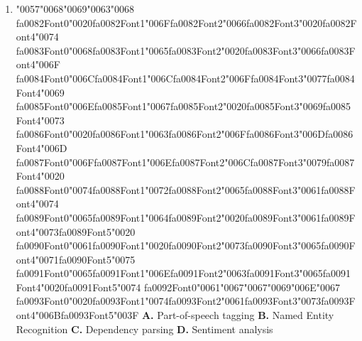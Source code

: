 \documentclass[11pt]{article}
\begin{document}
\begin{enumerate}[leftmargin=*]
  \item {\char"0057}{\char"0068}{\char"0069}{\char"0063}{\char"0068} {\csname fa0082Font0\endcsname\char"0020}{\csname fa0082Font1\endcsname\char"006F}{\csname fa0082Font2\endcsname\char"0066}{\csname fa0082Font3\endcsname\char"0020}{\csname fa0082Font4\endcsname\char"0074} {\csname fa0083Font0\endcsname\char"0068}{\csname fa0083Font1\endcsname\char"0065}{\csname fa0083Font2\endcsname\char"0020}{\csname fa0083Font3\endcsname\char"0066}{\csname fa0083Font4\endcsname\char"006F} {\csname fa0084Font0\endcsname\char"006C}{\csname fa0084Font1\endcsname\char"006C}{\csname fa0084Font2\endcsname\char"006F}{\csname fa0084Font3\endcsname\char"0077}{\csname fa0084Font4\endcsname\char"0069} {\csname fa0085Font0\endcsname\char"006E}{\csname fa0085Font1\endcsname\char"0067}{\csname fa0085Font2\endcsname\char"0020}{\csname fa0085Font3\endcsname\char"0069}{\csname fa0085Font4\endcsname\char"0073} {\csname fa0086Font0\endcsname\char"0020}{\csname fa0086Font1\endcsname\char"0063}{\csname fa0086Font2\endcsname\char"006F}{\csname fa0086Font3\endcsname\char"006D}{\csname fa0086Font4\endcsname\char"006D} {\csname fa0087Font0\endcsname\char"006F}{\csname fa0087Font1\endcsname\char"006E}{\csname fa0087Font2\endcsname\char"006C}{\csname fa0087Font3\endcsname\char"0079}{\csname fa0087Font4\endcsname\char"0020} {\csname fa0088Font0\endcsname\char"0074}{\csname fa0088Font1\endcsname\char"0072}{\csname fa0088Font2\endcsname\char"0065}{\csname fa0088Font3\endcsname\char"0061}{\csname fa0088Font4\endcsname\char"0074} {\csname fa0089Font0\endcsname\char"0065}{\csname fa0089Font1\endcsname\char"0064}{\csname fa0089Font2\endcsname\char"0020}{\csname fa0089Font3\endcsname\char"0061}{\csname fa0089Font4\endcsname\char"0073}{\csname fa0089Font5\endcsname\char"0020} {\csname fa0090Font0\endcsname\char"0061}{\csname fa0090Font1\endcsname\char"0020}{\csname fa0090Font2\endcsname\char"0073}{\csname fa0090Font3\endcsname\char"0065}{\csname fa0090Font4\endcsname\char"0071}{\csname fa0090Font5\endcsname\char"0075} {\csname fa0091Font0\endcsname\char"0065}{\csname fa0091Font1\endcsname\char"006E}{\csname fa0091Font2\endcsname\char"0063}{\csname fa0091Font3\endcsname\char"0065}{\csname fa0091Font4\endcsname\char"0020}{\csname fa0091Font5\endcsname\char"0074} {\csname fa0092Font0\endcsname\char"0061}{\char"0067}{\char"0067}{\char"0069}{\char"006E}{\char"0067} {\csname fa0093Font0\endcsname\char"0020}{\csname fa0093Font1\endcsname\char"0074}{\csname fa0093Font2\endcsname\char"0061}{\csname fa0093Font3\endcsname\char"0073}{\csname fa0093Font4\endcsname\char"006B}{\csname fa0093Font5\endcsname\char"003F}
    \textbf{A.} Part-of-speech tagging
    \textbf{B.} Named Entity Recognition
    \textbf{C.} Dependency parsing
    \textbf{D.} Sentiment analysis


\end{enumerate}
\end{document}
